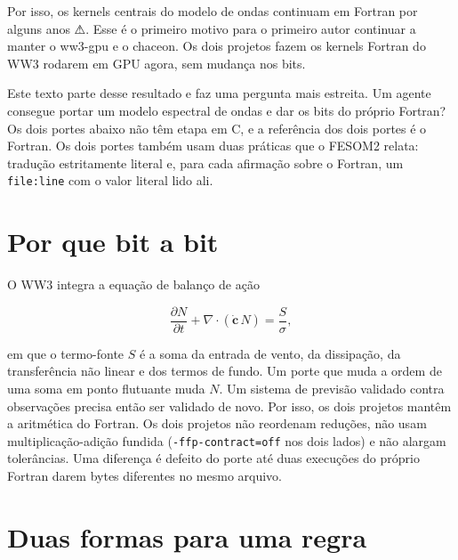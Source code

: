 \documentclass[10pt,a4paper,]{article}
\begin{document}
Por isso, os kernels centrais do modelo de ondas continuam em Fortran
por alguns anos ⚠. Esse é o primeiro motivo para o primeiro autor
continuar a manter o ww3-gpu e o chaceon. Os dois projetos fazem os
kernels Fortran do WW3 rodarem em GPU agora, sem mudança nos bits.

Este texto parte desse resultado e faz uma pergunta mais estreita. Um
agente consegue portar um modelo espectral de ondas e dar os bits do
próprio Fortran? Os dois portes abaixo não têm etapa em C, e a
referência dos dois portes é o Fortran. Os dois portes também usam duas
práticas que o FESOM2 relata: tradução estritamente literal e, para cada
afirmação sobre o Fortran, um \texttt{file:line} com o valor literal
lido ali.

\section{Por que bit a bit}\label{sec:why}

O WW3 integra a equação de balanço de ação

\[\frac{\partial N}{\partial t} + \nabla\cdot(\dot{\mathbf{c}}\,N) = \frac{S}{\sigma},\]

em que o termo-fonte \(S\) é a soma da entrada de vento, da dissipação,
da transferência não linear e dos termos de fundo. Um porte que muda a
ordem de uma soma em ponto flutuante muda \(N\). Um sistema de previsão
validado contra observações precisa então ser validado de novo. Por
isso, os dois projetos mantêm a aritmética do Fortran. Os dois projetos
não reordenam reduções, não usam multiplicação-adição fundida
(\texttt{-ffp-contract=off} nos dois lados) e não alargam tolerâncias.
Uma diferença é defeito do porte até duas execuções do próprio Fortran
darem bytes diferentes no mesmo arquivo.

\section{Duas formas para uma regra}\label{sec:shapes}
\end{document}
